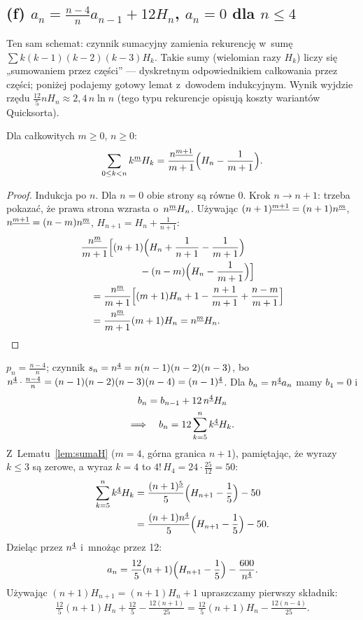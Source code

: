 \documentclass[11pt]{article}
\begin{document}
\subsection*{(f) $a_n=\frac{n-4}{n}a_{n-1}+12H_n$, $a_n=0$ dla $n\le4$}
\begin{intuicja}
Ten sam schemat: czynnik sumacyjny zamienia rekurencję w~sumę
$\sum k(k-1)(k-2)(k-3)H_k$. Takie sumy (wielomian razy $H_k$) liczy się
„sumowaniem przez części” --- dyskretnym odpowiednikiem całkowania przez
części; poniżej podajemy gotowy lemat z~dowodem indukcyjnym. Wynik wyjdzie
rzędu $\frac{12}{5}nH_n\approx 2{,}4\,n\ln n$ (tego typu rekurencje opisują
koszty wariantów Quicksorta).
\end{intuicja}

\begin{lemat}\label{lem:sumaH}
Dla całkowitych $m\ge0$, $n\ge0$:
\[
\sum_{0\le k<n}k^{\underline{m}}H_k = \frac{n^{\underline{m+1}}}{m+1}\Bigl(H_n-\frac{1}{m+1}\Bigr).
\]
\end{lemat}
\begin{proof}
Indukcja po $n$. Dla $n=0$ obie strony są równe $0$. Krok $n\to n+1$: trzeba
pokazać, że prawa strona wzrasta o~$n^{\underline{m}}H_n$. Używając
$(n+1)^{\underline{m+1}}=(n+1)n^{\underline{m}}$, $n^{\underline{m+1}}=(n-m)n^{\underline{m}}$, $H_{n+1}=H_n+\frac1{n+1}$:
\begin{align*}
&\frac{n^{\underline{m}}}{m+1}\Bigl[(n+1)\Bigl(H_n+\frac{1}{n+1}-\frac{1}{m+1}\Bigr)\\
&\hspace{6em}-(n-m)\Bigl(H_n-\frac1{m+1}\Bigr)\Bigr]\\
&\quad=\frac{n^{\underline{m}}}{m+1}\Bigl[(m+1)H_n + 1 - \frac{n+1}{m+1}+\frac{n-m}{m+1}\Bigr]\\
&\quad=\frac{n^{\underline{m}}}{m+1}(m+1)H_n = n^{\underline{m}}H_n.\qedhere
\end{align*}
\end{proof}

\formalnie
$p_n=\frac{n-4}{n}$; czynnik $s_n=n^{\underline{4}}=n(n-1)(n-2)(n-3)$, bo
$n^{\underline{4}}\cdot\frac{n-4}{n} = (n-1)(n-2)(n-3)(n-4)=(n-1)^{\underline{4}}$.
Dla $b_n=n^{\underline{4}}a_n$ mamy $b_4=0$ i
\begin{gather*}
b_n = b_{n-1}+12\,n^{\underline{4}}H_n\\
\Longrightarrow\quad b_n = 12\sum_{k=5}^nk^{\underline{4}}H_k.
\end{gather*}
Z~Lematu~\ref{lem:sumaH} ($m=4$, górna granica $n+1$), pamiętając, że wyrazy
$k\le3$ są zerowe, a wyraz $k=4$ to $4!\,H_4 = 24\cdot\frac{25}{12}=50$:
\begin{align*}
\sum_{k=5}^nk^{\underline{4}}H_k &= \frac{(n+1)^{\underline{5}}}{5}\Bigl(H_{n+1}-\frac15\Bigr) - 50\\
&= \frac{(n+1)n^{\underline{4}}}{5}\Bigl(H_{n+1}-\frac15\Bigr) - 50.
\end{align*}
Dzieląc przez $n^{\underline{4}}$ i~mnożąc przez 12:
\[
a_n = \frac{12}{5}(n+1)\Bigl(H_{n+1}-\frac15\Bigr) - \frac{600}{n^{\underline{4}}}.
\]
Używając $(n+1)H_{n+1}=(n+1)H_n+1$ upraszczamy pierwszy składnik:
\[
\tfrac{12}{5}(n+1)H_n+\tfrac{12}{5}-\tfrac{12(n+1)}{25} = \tfrac{12}{5}(n+1)H_n-\tfrac{12(n-4)}{25}.
\]
\end{document}
